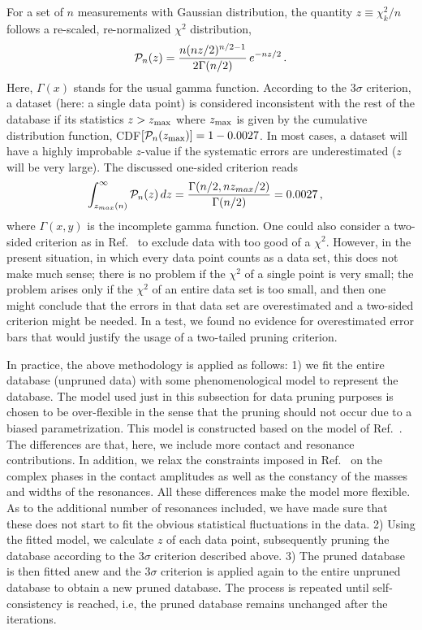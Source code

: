\documentclass[10pt,aps,prc,superscriptaddress,twoside,twocolumn,nofootinbib,showpacs,preprintnumbers]{revtex4-1}
\begin{document}
For a set of $n$ measurements with Gaussian distribution, the quantity $z \equiv \chi^2_k/n$ follows a re-scaled, re-normalized $\chi^2$ distribution,
%
\begin{equation}
{\cal P}_n(z) = \frac{n(nz/2)^{n/2 - 1}}{2\Gamma(n/2)}\, e^{-nz/2}\,.
\label{eq:DP1}
\end{equation}
%
Here, $\Gamma(x)$ stands for the usual gamma function.
According to the $3\sigma$ criterion, a dataset (here: a single data point) is considered inconsistent with the rest of the database if its statistics $z>z_{\rm max}$ where $z_{\rm max}$ is given by the cumulative distribution function, CDF$[{\cal P}_n(z_{\rm max})]=1-0.0027$. In most cases, a dataset will have a highly improbable $z$-value if the systematic errors are underestimated ($z$ will be very large). The discussed one-sided criterion reads
%
\begin{align}
\int_{z_{max}(n)}^\infty  {\cal P}_n(z)\, dz & = \frac{\Gamma(n/2, nz_{max}/2)}{\Gamma(n/2)} = 0.0027\,,
\label{eq:DP2}
\end{align}
where $\Gamma(x,y)$ is the incomplete gamma function.
One could also consider a two-sided criterion as in Ref.~\cite{Perez:2014yla} to exclude data with too good of a $\chi^2$. However, in the present situation, in which every data point counts as a data set, this does not make much sense; there is no problem if the $\chi^2$ of a single point is very small; the problem arises only if the $\chi^2$ of an entire data set is too small, and then one might conclude that the errors in that data set are overestimated and a two-sided criterion might be needed. In a test, we found no evidence for overestimated error bars that would justify the usage of a two-tailed pruning criterion.

In practice, the above methodology is applied as follows: 1) we fit the entire database (unpruned data)  with some phenomenological model to 
represent the database. The model used just in this subsection for data pruning purposes is chosen to be over-flexible in the sense that the pruning should not occur due to a biased parametrization. This model is constructed based on the model of Ref.~\cite{Jackson:2015dva}. The differences are that, here, we include more contact and resonance contributions. In addition, we relax the constraints imposed in Ref.~\cite{Jackson:2015dva} on the complex phases in the contact amplitudes as well as the constancy of the masses and widths of the resonances. All these differences make the model more flexible. As to the additional number of resonances included, we have made sure that these does not start to fit the obvious statistical fluctuations in the data.
2) Using the fitted model, we calculate $z$ of each data point, subsequently pruning the database according to the $3\sigma$ criterion described above. 3) The pruned database is then fitted anew and the $3\sigma$ criterion is applied again to the entire unpruned database to obtain a new pruned database. The process is repeated until  self-consistency is reached, i.e, the pruned database remains unchanged after the iterations. 
\end{document}
